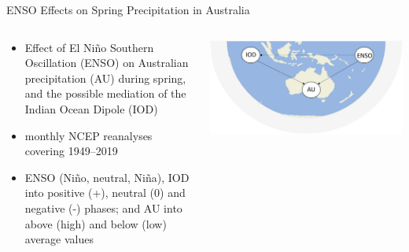 \documentclass{beamer}
\begin{document}
\begin{frame}{ENSO Effects on Spring Precipitation in
Australia}
\begin{columns}
    \begin{column}{0.5\textwidth}
        \begin{itemize}
		\item Effect of El Niño Southern Oscillation (ENSO) 
on Australian precipitation (AU) during
spring, and the possible mediation of the 
Indian Ocean Dipole (IOD)~\citep{QuantifyingCausalPathwaysofTeleconnections}
\item monthly NCEP reanalyses covering 1949–2019
\item ENSO (Niño, neutral, Niña), IOD into positive (+), neutral (0) and negative (-) phases; 
	and AU into
above (high) and below (low) average values
 
\end{itemize}
    \end{column}

    \begin{column}{0.45\textwidth}
	    \includegraphics[scale=3]{images/enso-iod-au}
    \end{column}
\end{columns}
  \end{frame}

\begin{frame}[allowframebreaks]
 
\end{frame}
\end{document}
